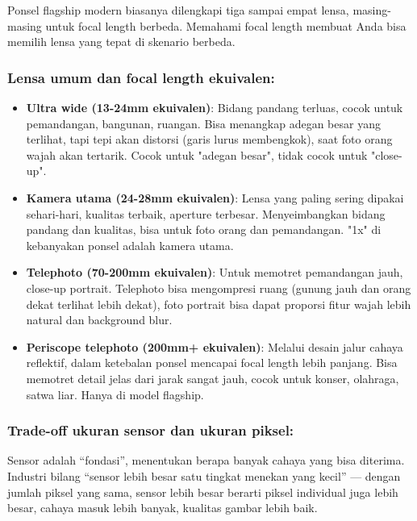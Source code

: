 
Ponsel flagship modern biasanya dilengkapi tiga sampai empat lensa, masing-masing untuk focal length berbeda. Memahami focal length membuat Anda bisa memilih lensa yang tepat di skenario berbeda.

\subsubsection*{Lensa umum dan focal length ekuivalen:}

\begin{itemize}
  \item \textbf{Ultra wide (13-24mm ekuivalen)}: Bidang pandang terluas, cocok untuk pemandangan, bangunan, ruangan. Bisa menangkap adegan besar yang terlihat, tapi tepi akan distorsi (garis lurus membengkok), saat foto orang wajah akan tertarik. Cocok untuk "adegan besar", tidak cocok untuk "close-up".
  \item \textbf{Kamera utama (24-28mm ekuivalen)}: Lensa yang paling sering dipakai sehari-hari, kualitas terbaik, aperture terbesar. Menyeimbangkan bidang pandang dan kualitas, bisa untuk foto orang dan pemandangan. "1x" di kebanyakan ponsel adalah kamera utama.
  \item \textbf{Telephoto (70-200mm ekuivalen)}: Untuk memotret pemandangan jauh, close-up portrait. Telephoto bisa mengompresi ruang (gunung jauh dan orang dekat terlihat lebih dekat), foto portrait bisa dapat proporsi fitur wajah lebih natural dan background blur.
  \item \textbf{Periscope telephoto (200mm+ ekuivalen)}: Melalui desain jalur cahaya reflektif, dalam ketebalan ponsel mencapai focal length lebih panjang. Bisa memotret detail jelas dari jarak sangat jauh, cocok untuk konser, olahraga, satwa liar. Hanya di model flagship.
\end{itemize}

\subsubsection*{Trade-off ukuran sensor dan ukuran piksel:}

Sensor adalah “fondasi”, menentukan berapa banyak cahaya yang bisa diterima. Industri bilang “sensor lebih besar satu tingkat menekan yang kecil” — dengan jumlah piksel yang sama, sensor lebih besar berarti piksel individual juga lebih besar, cahaya masuk lebih banyak, kualitas gambar lebih baik.

